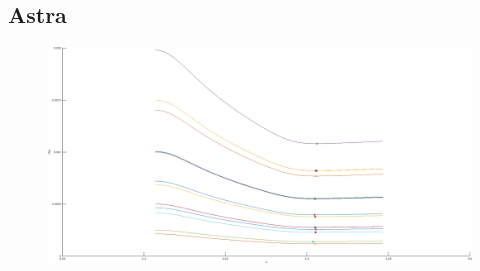 \subsection{Astra}
   \begin{center}
      \begin{figure}[H]
         \includegraphics[width=\textwidth]{fig/astra}
      \end{figure}
   \end{center}
